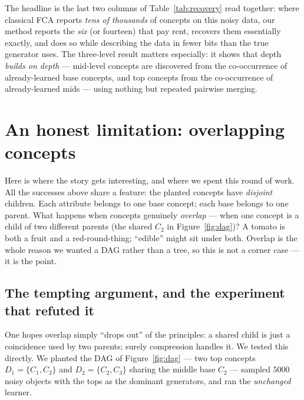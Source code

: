 \documentclass[11pt]{article}
\begin{document}
The headline is the last two columns of Table~\ref{tab:recovery} read together:
where classical FCA reports \emph{tens of thousands} of concepts on this noisy
data, our method reports the \emph{six} (or fourteen) that pay rent, recovers
them essentially exactly, and does so while describing the data in fewer bits
than the true generator uses. The three-level result matters especially: it
shows that depth \emph{builds on depth} --- mid-level concepts are discovered
from the co-occurrence of already-learned base concepts, and top concepts from
the co-occurrence of already-learned mids --- using nothing but repeated pairwise
merging.

\section{An honest limitation: overlapping concepts}
\label{sec:overlap}

Here is where the story gets interesting, and where we spent this round of work.
All the successes above share a feature: the planted concepts have
\emph{disjoint} children. Each attribute belongs to one base concept; each base
belongs to one parent. What happens when concepts genuinely \emph{overlap} ---
when one concept is a child of two different parents (the shared $C_2$ in
Figure~\ref{fig:dag})? A tomato is both a fruit and a red-round-thing;
``edible'' might sit under both. Overlap is the whole reason we wanted a DAG
rather than a tree, so this is not a corner case --- it is the point.

\subsection{The tempting argument, and the experiment that refuted it}

One hopes overlap simply ``drops out'' of the principles: a shared child is just
a coincidence used by two parents; surely compression handles it. We tested this
directly. We planted the DAG of Figure~\ref{fig:dag} --- two top concepts
$D_1=\{C_1,C_2\}$ and $D_2=\{C_2,C_3\}$ sharing the middle base $C_2$ --- sampled
$5000$ noisy objects with the tops as the dominant generators, and ran the
\emph{unchanged} learner.
\end{document}

